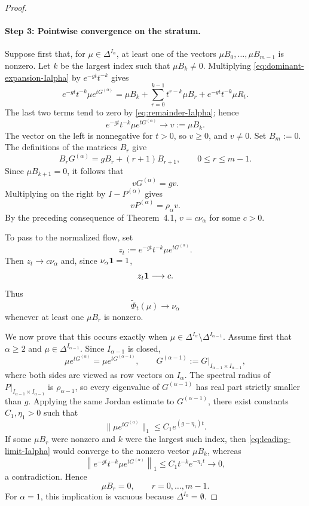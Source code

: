\documentclass[10pt,letterpaper]{article}
\theoremstyle{compactplain}
\theoremstyle{compactdefinition}
\newcommand{\1}{\mathds{1}}
\begin{document}
\begin{proof}
\paragraph{Step 3: Pointwise convergence on the stratum.}
Suppose first that, for $\mu\in\Delta^{I_\alpha}$, at least one of the
vectors $\mu B_0,\ldots,\mu B_{m-1}$ is nonzero. Let $k$ be the largest
index such that $\mu B_k\neq0$. Multiplying
\eqref{eq:dominant-expansion-Ialpha} by $e^{-gt}t^{-k}$ gives
\[
e^{-gt}t^{-k}\mu e^{tG^{(\alpha)}}
=
\mu B_k
+
\sum_{r=0}^{k-1}t^{r-k}\mu B_r
+
e^{-gt}t^{-k}\mu R_t.
\]
The last two terms tend to zero by \eqref{eq:remainder-Ialpha}; hence
\begin{equation}
\label{eq:leading-limit-Ialpha}
e^{-gt}t^{-k}\mu e^{tG^{(\alpha)}}
\longrightarrow
v:=\mu B_k.
\end{equation}
The vector on the left is nonnegative for $t>0$, so $v\geq0$, and $v\neq0$.
Set $B_m:=0$. The definitions of the matrices $B_r$ give
\[
B_rG^{(\alpha)}=gB_r+(r+1)B_{r+1},
\qquad 0\leq r\leq m-1.
\]
Since $\mu B_{k+1}=0$, it follows that
\[
vG^{(\alpha)}=gv.
\]
Multiplying on the right by $I-P^{(\alpha)}$ gives
\[
vP^{(\alpha)}=\rho_\alpha v.
\]
By the preceding consequence of Theorem~4.1, $v=c\nu_\alpha$ for some
$c>0$.

To pass to the normalized flow, set
\[
z_t:=e^{-gt}t^{-k}\mu e^{tG^{(\alpha)}}.
\]
Then $z_t\to c\nu_\alpha$ and, since $\nu_\alpha{\bf 1}=1$,
\[
z_t{\bf 1}\longrightarrow c.
\]
Thus
\begin{equation}
\label{eq:pointwise-visible-Ialpha}
\widetilde\Phi_t(\mu)\longrightarrow\nu_\alpha
\end{equation}
whenever at least one $\mu B_r$ is nonzero.

We now prove that this occurs exactly when
\(
\mu\in\Delta^{I_\alpha}\setminus\Delta^{I_{\alpha-1}}.
\)
Assume first that $\alpha\geq2$ and
$\mu\in\Delta^{I_{\alpha-1}}$. Since $I_{\alpha-1}$ is closed,
\[
\mu e^{tG^{(\alpha)}}
=
\mu e^{tG^{(\alpha-1)}},
\qquad
G^{(\alpha-1)}:=G|_{I_{\alpha-1}\times I_{\alpha-1}},
\]
where both sides are viewed as row vectors on $I_\alpha$. The spectral radius
of $P|_{I_{\alpha-1}\times I_{\alpha-1}}$ is $\rho_{\alpha-1}$, so every
eigenvalue of $G^{(\alpha-1)}$ has real part strictly smaller than $g$.
Applying the same Jordan estimate to $G^{(\alpha-1)}$, there exist constants
$C_1,\eta_1>0$ such that
\[
\|\mu e^{tG^{(\alpha)}}\|_1
\leq
C_1e^{(g-\eta_1)t}.
\]
If some $\mu B_r$ were nonzero and $k$ were the largest such index, then
\eqref{eq:leading-limit-Ialpha} would converge to the nonzero vector
$\mu B_k$, whereas
\[
\left\|e^{-gt}t^{-k}\mu e^{tG^{(\alpha)}}\right\|_1
\leq
C_1t^{-k}e^{-\eta_1t}
\longrightarrow0,
\]
a contradiction. Hence
\[
\mu B_r=0,
\qquad r=0,\ldots,m-1.
\]
For $\alpha=1$, this implication is vacuous because
$\Delta^{I_0}=\emptyset$.


\end{proof}
\end{document}
